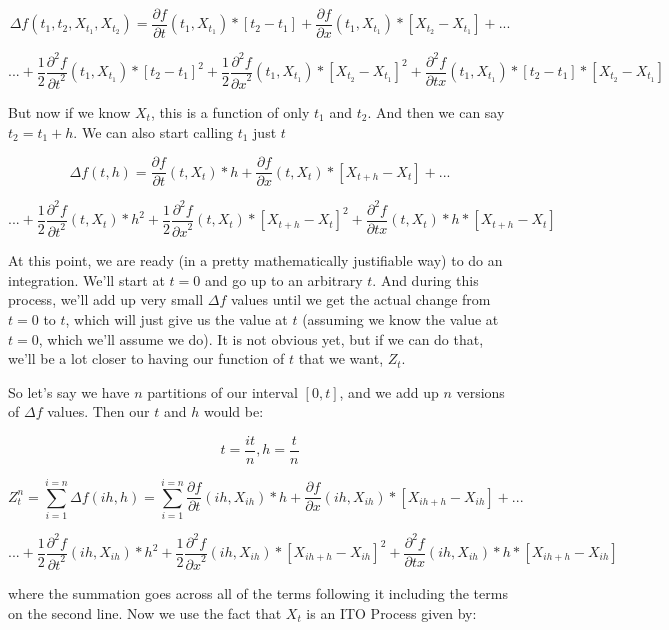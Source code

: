 \documentclass{article}
\begin{document}
$$\Delta f(t_1,t_2,X_{t_1},X_{t_2}) = \frac{\partial f}{\partial t}(t_1,X_{t_1}) *[t_2-t_1] + \frac{\partial f}{\partial x}(t_1,X_{t_1}) *[X_{t_2}-X_{t_1}]  + ... $$

$$... +  \frac{1}{2}\frac{\partial^2 f}{{\partial t}^2}(t_1,X_{t_1}) * {[t_2-t_1]}^2 + \frac{1}{2}\frac{\partial^2 f}{{\partial x}^2}(t_1,X_{t_1}) * {[X_{t_2}-X_{t_1}]}^2 +  \frac{\partial^2 f}{\partial tx}(t_1,X_{t_1}) *[t_2-t_1]*[X_{t_2}-X_{t_1}]$$

But now if we know $X_t$, this is a function of only $t_1$ and $t_2$.  And then we can say $t_2 = t_1 + h$. We can also start calling $t_1$ just $t$

$$\Delta f(t,h) = \frac{\partial f}{\partial t}(t,X_{t}) *h + \frac{\partial f}{\partial x}(t,X_{t}) *[X_{t+h}-X_{t}]  + ... $$

$$... +  \frac{1}{2}\frac{\partial^2 f}{{\partial t}^2}(t,X_{t}) * {h}^2 + \frac{1}{2}\frac{\partial^2 f}{{\partial x}^2}(t,X_{t}) * {[X_{t+h}-X_{t}]}^2 +  \frac{\partial^2 f}{\partial tx}(t,X_{t}) *h*[X_{t+h}-X_{t}]$$

At this point, we are ready (in a pretty mathematically justifiable way) to do an integration. We'll start at $t=0$ and go up to an arbitrary $t$.  And during this process, we'll add up very small $\Delta f$ values until we get the actual change from $t=0$ to $t$, which will just give us the value at $t$ (assuming we know the value at $t=0$, which we'll assume we do).  It is not obvious yet, but if we can do that, we'll be a lot closer to having our function of $t$ that we want, $Z_t$. 

So let's say we have $n$ partitions of our interval $[0,t]$, and we add up $n$ versions of $\Delta f$ values.  Then our $t$ and $h$ would be:

$$t = \frac{it}{n}, h = \frac{t}{n}$$

$$Z_t^n = \sum_{i=1}^{i = n} \Delta f\left(ih,h\right) = \sum_{i=1}^{i = n} \frac{\partial f}{\partial t}(ih,X_{ih}) *h + \frac{\partial f}{\partial x}(ih,X_{ih}) *[X_{ih+h}-X_{ih}]  + ... $$

$$... +  \frac{1}{2}\frac{\partial^2 f}{{\partial t}^2}(ih,X_{ih}) * {h}^2 + \frac{1}{2}\frac{\partial^2 f}{{\partial x}^2}(ih,X_{ih}) * {[X_{ih+h}-X_{ih}]}^2 +  \frac{\partial^2 f}{\partial tx}(ih,X_{ih}) *h*[X_{ih+h}-X_{ih}]$$

where the summation goes across all of the terms following it including the terms on the second line. Now we use the fact that $X_t$ is an ITO Process given by:
\end{document}
